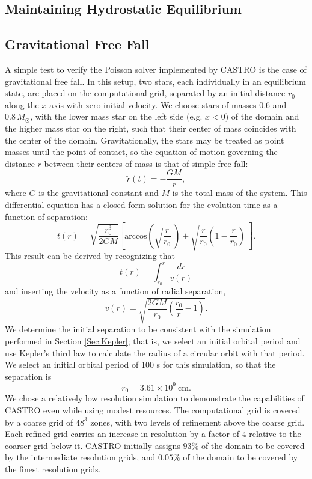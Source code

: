 \documentclass[12pt,preprint]{aastex}
\newcommand{\MarginPar}[1]{\marginpar{\vskip-\baselineskip\raggedright\tiny\sffamily\hrule\smallskip{\color{red}#1}\par\smallskip\hrule}}
\begin{document}
\subsection{Maintaining Hydrostatic Equilibrium}\label{Sec:HSE}

\subsection{Gravitational Free Fall}\label{Sec:Gravitational Free Fall}

A simple test to verify the Poisson solver implemented by CASTRO is
the case of gravitational free fall. In this setup, two stars, each
individually in an equilibrium state, are placed on the computational
grid, separated by an initial distance $r_0$ along the $x$ axis with
zero initial velocity. We choose stars of masses $0.6$ and $0.8\,
M_\odot$, with the lower mass star on the left side (e.g. $x < 0$) of
the domain and the higher mass star on the right, such that their
center of mass coincides with the center of the
domain. Gravitationally, the stars may be treated as point masses
until the point of contact, so the equation of motion governing the
distance $r$ between their centers of mass is that of simple free
fall:
\begin{equation}
  \ddot{r}(t) = - \frac{GM}{r},
\end{equation}
where $G$ is the gravitational constant and $M$ is the total mass of
the system. This differential equation has a closed-form solution for
the evolution time as a function of separation:
\begin{equation}
  t(r) = \sqrt{\frac{r_0^3}{2GM}} \left[ \text{arccos}\left(\sqrt{\frac{r}{r_0}}\,\right) + \sqrt{\frac{r}{r_0} \left(1 - \frac{r}{r_0}\right)}\ \right]. \label{analyticalFreeFall}
\end{equation}\MarginPar{This result is derived in the freefall directory.}
This result can be derived by recognizing that
\[
  t(r) = \int_{r_0}^r \frac{dr}{v(r)}
\]
and inserting the velocity as a function of radial separation,
\[
  v(r) = \sqrt{\frac{2GM}{r_0}\left(\frac{r_0}{r} - 1\right)}.
\]
We determine the initial separation to be consistent with the
simulation performed in Section \ref{Sec:Kepler}; that is, we select
an initial orbital period and use Kepler's third law to calculate the
radius of a circular orbit with that period. We select an initial
orbital period of 100 s for this simulation, so that the separation is
\[
  r_0 = 3.61 \times 10^{9}\ \text{cm}.
\]
We chose a relatively low resolution simulation to demonstrate the
capabilities of CASTRO even while using modest resources. The
computational grid is covered by a coarse grid of $48^3$ zones, with
two levels of refinement above the coarse grid. Each refined grid
carries an increase in resolution by a factor of 4 relative to the
coarser grid below it. CASTRO initially assigns $93\%$ of the domain
to be covered by the intermediate resolution grids, and $0.05\%$ of
the domain to be covered by the finest resolution grids.
\end{document}
